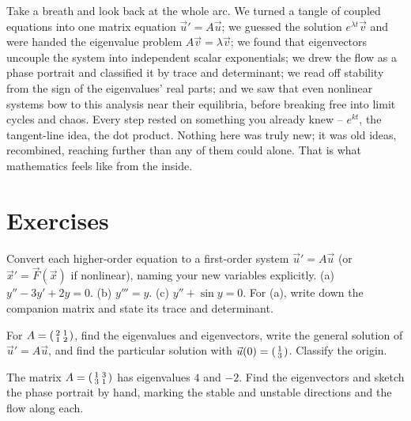 \begin{recoverybox}
Take a breath and look back at the whole arc. We turned a tangle of coupled
equations into one matrix equation $\vec u' = A\vec u$; we guessed the solution
$e^{\lambda t}\vec v$ and were handed the eigenvalue problem $A\vec v = \lambda
\vec v$; we found that eigenvectors uncouple the system into independent scalar
exponentials; we drew the flow as a phase portrait and classified it by trace and
determinant; we read off stability from the sign of the eigenvalues' real parts;
and we saw that even nonlinear systems bow to this analysis near their
equilibria, before breaking free into limit cycles and chaos. Every step rested
on something you already knew -- $e^{kt}$, the tangent-line idea, the dot
product. Nothing here was truly new; it was old ideas, recombined, reaching
further than any of them could alone. That is what mathematics feels like from
the inside.
\end{recoverybox}

\section{Exercises}
\label{ch39:exercises}

\begin{exercise}
Convert each higher-order equation to a first-order system $\vec u' = A\vec u$
(or $\vec x' = \vec F(\vec x)$ if nonlinear), naming your new variables
explicitly. (a) $y'' - 3y' + 2y = 0$. (b) $y''' = y$. (c) $y'' + \sin y = 0$.
For (a), write down the companion matrix and state its trace and determinant.
\end{exercise}

\begin{exercise}
For $A = \begin{psmallmatrix} 2 & 1 \\ 1 & 2\end{psmallmatrix}$, find the
eigenvalues and eigenvectors, write the general solution of $\vec u' = A\vec u$,
and find the particular solution with $\vec u(0) = \begin{psmallmatrix} 1 \\
3\end{psmallmatrix}$. Classify the origin.
\end{exercise}

\begin{exercise}[A saddle]
The matrix $A = \begin{psmallmatrix} 1 & 3 \\ 3 & 1\end{psmallmatrix}$ has
eigenvalues $4$ and $-2$. Find the eigenvectors and sketch the phase portrait by
hand, marking the stable and unstable directions and the flow along each.
\end{exercise}


